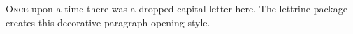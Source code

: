 \documentclass{article}
\begin{document}
\lettrine{O}{nce} upon a time there was a dropped capital letter here.
The lettrine package creates this decorative paragraph opening style.
\end{document}
